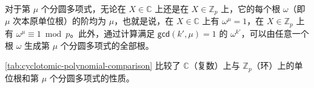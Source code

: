 对于第 $\mu$ 个分圆多项式，无论在 $X \in \mathbb{C}$ 上还是在 $X \in \mathbb{Z}_p$ 上，它的每个根 $\omega$（即 $\mu$ 次本原单位根）的阶均为 $\mu$，也就是说，在 $X \in \mathbb{C}$ 上有 $\omega^{\mu} = 1$，在 $X \in \mathbb{Z}_p$ 上有 $\omega^{\mu} \equiv 1 \bmod p$。此外，通过计算满足 $\textsf{gcd}(k', \mu) = 1$ 的 $\omega^{k'}$，可以由任意一个根 $\omega$ 生成第 $\mu$ 个分圆多项式的全部根。

\autoref{tab:cyclotomic-polynomial-comparison} 比较了 $\mathbb{C}$（复数）上与 $\mathbb{Z}_p$（环）上的单位根和第 $\mu$ 个分圆多项式的性质。
